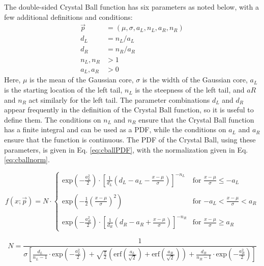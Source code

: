 The double-sided Crystal Ball function has six parameters as noted below, with a few additional definitions and conditions:
\begin{align}
\vec{p} &= (\mu,\sigma,a_{L},n_{L},a_{R},n_{R}) \\
d_{L} &= n_{L}/a_{L} \\
d_{R} &= n_{R}/a_{R} \\
n_{L}, n_{R} &> 1\\
a_{L}, a_{R} &> 0
\end{align}
Here, $\mu$ is the mean of the Gaussian core, $\sigma$ is the width of the Gaussian core, $a_{L}$ is the starting location of the left tail, $n_{L}$ is the steepness of the left tail, and $a{R}$ and $n_{R}$ act similarly for the left tail. The parameter combinations $d_{L}$ and $d_{R}$ appear frequently in the definition of the Crystal Ball function, so it is useful to define them. The conditions on $n_{L}$ and $n_{R}$ ensure that the Crystal Ball function has a finite integral and can be used as a PDF, while the conditions on $a_{L}$ and $a_{R}$ ensure that the function is continuous. The PDF of the Crystal Ball, using these parameters, is given in Eq. \eqref{eq:cballPDF}, with the normalization given in Eq. \eqref{eq:cballnorm}.

\begin{equation}
f(x;\vec{p}) = N \cdot \begin{cases}
\text{exp}\left(-\frac{a_{L}^{2}}{2}\right) \cdot \left[\frac{1}{d_{L}}\left(d_{L} - a_{L} - \frac{x-\mu}{\sigma}\right)\right]^{-n_{L}} & \text{for $\frac{x-\mu}{\sigma} \leq -a_{L}$} \\
\\
\text{exp}\left(-\frac{1}{2}\left(\frac{x-\mu}{\sigma}\right)^2\right) & \text{for $-a_{L} < \frac{x-\mu}{\sigma} < a_{R}$} \\
\\
\text{exp}\left(-\frac{a_{R}^{2}}{2}\right) \cdot \left[\frac{1}{d_{R}}\left(d_{R} - a_{R} + \frac{x-\mu}{\sigma}\right)\right]^{-n_{R}} & \text{for $\frac{x-\mu}{\sigma} \geq a_{R}$}
\end{cases}
\label{eq:cballPDF}
\end{equation}

\begin{equation}
N = \frac{1}{\sigma\left[\frac{d_{L}}{n_{L}-1} \cdot \text{exp}\left(-\frac{a_{L}^{2}}{2}\right) + \sqrt{\frac{\pi}{2}}\left(\text{erf}\left(\frac{a_{L}}{\sqrt{2}}\right)+\text{erf}\left(\frac{a_{R}}{\sqrt{2}}\right)\right) + \frac{d_{R}}{n_{R}-1} \cdot \text{exp}\left(-\frac{a_{R}^{2}}{2}\right)  \right]}
\label{eq:cballnorm}
\end{equation}


